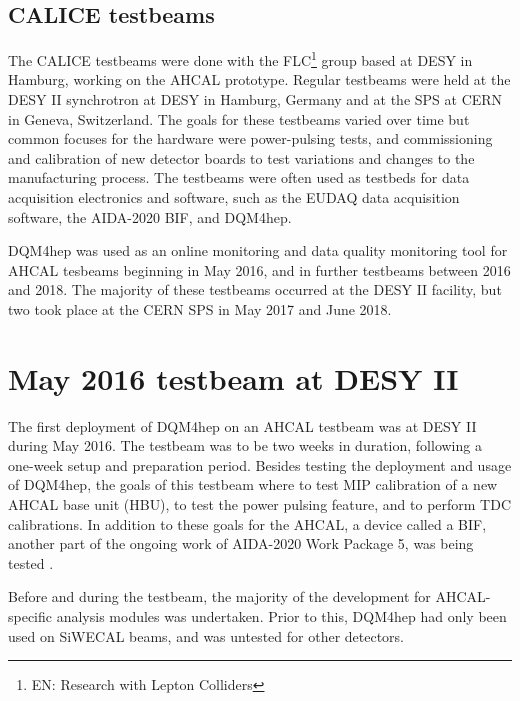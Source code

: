 \subsection*{CALICE testbeams}
The \acrshort{CALICE} testbeams were done with the \acrfull{FLC}\footnote{EN: Research with Lepton Colliders} group based at \acrshort{DESY} in Hamburg, working on the \acrshort{AHCAL} prototype. Regular testbeams were held at the DESY II synchrotron at \acrshort{DESY} in Hamburg, Germany and at the \acrfull{SPS} at \acrshort{CERN} in Geneva, Switzerland. The goals for these testbeams varied over time but common focuses for the hardware were power-pulsing tests, and commissioning and calibration of new detector boards to test variations and changes to the manufacturing process. The testbeams were often used as testbeds for data acquisition electronics and software, such as the \acrshort{EUDAQ} data acquisition software, the AIDA-2020 \acrfull{BIF}, and \acrshort{DQM4hep}.

\acrshort{DQM4hep} was used as an online monitoring and data quality monitoring tool for \acrshort{AHCAL} tesbeams beginning in May 2016, and in further testbeams between 2016 and 2018. The majority of these testbeams occurred at the DESY II facility, but two took place at the \acrshort{CERN} \acrshort{SPS} in May 2017 and June 2018.

\section{May 2016 testbeam at DESY II} %
The first deployment of \acrshort{DQM4hep} on an \acrshort{AHCAL} testbeam was at DESY II during May 2016. The testbeam was to be two weeks in duration, following a one-week setup and preparation period. Besides testing the deployment and usage of DQM4hep, the goals of this testbeam where to test \acrshort{MIP} calibration of a new \acrshort{AHCAL} base unit (HBU), to test the power pulsing feature, and to perform \acrshort{TDC} calibrations. In addition to these goals for the \acrshort{AHCAL}, a device called a \acrfull{BIF}, another part of the ongoing work of AIDA-2020 Work Package 5, was being tested  . 

Before and during the testbeam, the majority of the development for AHCAL-specific analysis modules was undertaken. Prior to this, \acrshort{DQM4hep} had only been used on \acrshort{SiWECAL} beams, and was untested for other detectors. 

